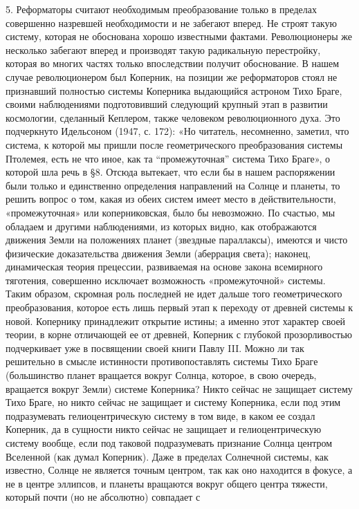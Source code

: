 5. Реформаторы считают необходимым преобразование только в пределах
совершенно назревшей необходимости и не забегают вперед. Не строят
такую систему, которая не обоснована хорошо известными фактами.
Революционеры же несколько забегают вперед и производят такую
радикальную перестройку, которая во многих частях только впоследствии
получит обоснование. В нашем случае революционером был Коперник, на
позиции же реформаторов стоял не признавший полностью системы
Коперника выдающийся астроном Тихо Браге, своими наблюдениями
подготовивший следующий крупный этап в развитии космологии, сделанный
Кеплером, также человеком революционного духа. Это подчеркнуто
Идельсоном (1947, с. 172): «Но читатель, несомненно, заметил, что
система, к которой мы пришли после геометрического преобразования
системы Птолемея, есть не что иное, как та ``промежуточная'' система
Тихо Браге», о которой шла речь в §8. Отсюда вытекает, что если бы в
нашем распоряжении были только и единственно определения направлений
на Солнце и планеты, то решить вопрос о том, какая из обеих систем
имеет место в действительности, «промежуточная» или коперниковская,
было бы невозможно. По счастью, мы обладаем и другими наблюдениями, из
которых видно, как отображаются движения Земли на положениях планет
(звездные параллаксы), имеются и чисто физические доказательства
движения Земли (аберрация света); наконец, динамическая теория
прецессии, развиваемая на основе закона всемирного тяготения,
совершенно исключает возможность «промежуточной» системы. Таким
образом, скромная роль последней не идет дальше того геометрического
преобразования, которое есть лишь первый этап к переходу от древней
системы к новой. Копернику принадлежит открытие истины; а именно этот
характер своей теории, в корне отличающей ее от древней, Коперник с
глубокой прозорливостью подчеркивает уже в посвящении своей книги
Павлу III. Можно ли так решительно в смысле истинности
противопоставлять системы Тихо Браге (большинство планет вращается
вокруг Солнца, которое, в свою очередь, вращается вокруг Земли)
системе Коперника? Никто сейчас не защищает систему Тихо Браге, но
никто сейчас не защищает и систему Коперника, если под этим
подразумевать гелиоцентрическую систему в том виде, в каком ее создал
Коперник, да в сущности никто сейчас не защищает и гелиоцентрическую
систему вообще, если под таковой подразумевать признание Солнца
центром Вселенной (как думал Коперник). Даже в пределах Солнечной
системы, как известно, Солнце не является точным центром, так как оно
находится в фокусе, а не в центре эллипсов, и планеты вращаются вокруг
общего центра тяжести, который почти (но не абсолютно) совпадает с
